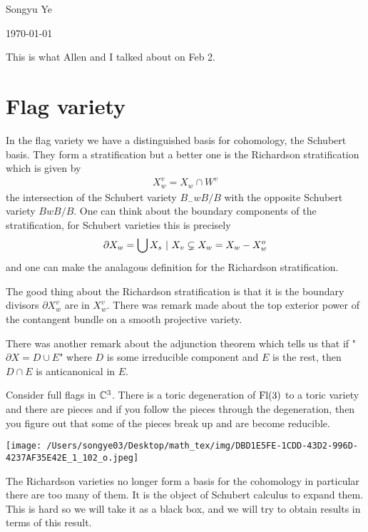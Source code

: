 \documentclass[12pt]{article}
\begin{document}
Songyu Ye

\today

This is what Allen and I talked about on Feb 2.

\section{Flag variety}
In the flag variety we have a distinguished basis for cohomology, the Schubert basis. They form a stratification but
a better one is the Richardson stratification which is given by \begin{align*}
    X_w^v =  X_w \cap W^v
\end{align*} the intersection of the Schubert variety $B_-wB/B$ with the opposite Schubert variety $BwB/B$. 
One can think about the boundary components of the stratification, for Schubert varieties this is precisely
\begin{align*}
    \partial X_w = \bigcup X_s \ \vert \  X_v \subsetneq X_w = X_w - X_w^o
\end{align*} and one can make the analagous definition for the Richardson stratification.

\hfill

The good thing about the Richardson stratification is that it is the boundary divisors $\partial X_w^v$ are  in $X_w^v$.
There was remark made about the top exterior power of the contangent bundle on a smooth projective variety.

\hfill 

There was another remark about the adjunction theorem which tells us that if "$\partial X = D \cup E$" where $D$ is some irreducible component
and $E$ is the rest, then $D\cap E$ is anticanonical in $E$.

\hfill

\begin{example}
    Consider full flags in $\mathbb{C}^3$. There is a toric degeneration of $\operatorname{Fl}(3)$ to a toric variety and there are pieces and
    if you follow the pieces through the degeneration, then you figure out that some of the pieces break up and 
    are become reducible.


    \begin{center}
        \texttt{[image: /Users/songye03/Desktop/math\_tex/img/DBD1E5FE-1CDD-43D2-996D-4237AF35E42E\_1\_102\_o.jpeg]}
    \end{center}
\end{example}
The Richardson varieties no longer form a basis for the cohomology in particular there are too many of them. 
It is the object of Schubert calculus to expand them. This is hard so we will take it as a black box, and
we will try to obtain results in terms of this result.
\end{document}
